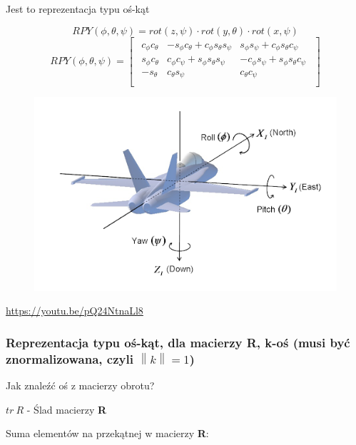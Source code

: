 \documentclass{article}
\newcommand{\norm}[1]{\left\lVert#1\right\rVert}
\begin{document}
Jest to reprezentacja typu oś-kąt

\Large
$$
    RPY\left(\phi, \theta, \psi\right)=rot(z, \psi) \cdot rot(y, \theta) \cdot rot(x, \psi)
$$
$$
    RPY( \phi, \theta, \psi ) = \begin{bmatrix} \begin{array}{rrr}
        c_{\phi} c_{\theta}   & -s_{\phi} c_{\theta} + c_{\phi} s_{\theta} s_{\psi} & s_{\phi} s_{\psi} + c_{\phi} s_{\theta} c_{\psi}  \\
        s_{\phi} c_{\theta}   & c_{\phi} c_{\psi} + s_{\phi} s_{\theta} s_{\psi}    & -c_{\phi} s_{\psi} + s_{\phi} s_{\theta} c_{\psi}  \\
        -s_{\theta}           & c_{\theta} s_{\psi}                                 & c_{\theta} c_{\psi}  \\
    \end{array} \end{bmatrix}
$$
\normalsize


\begin{figure}[h!]
    \centering
    \includegraphics[scale=0.5]{./img/rpy.png}
\end{figure}
\url{https://youtu.be/pQ24NtnaLl8}

\subsubsection{Reprezentacja typu oś-kąt, dla macierzy {\bf R}, k-oś (musi być znormalizowana, czyli $\norm{k}=1$)}

Jak znaleźć oś z macierzy obrotu?

$tr \ R$ - Ślad macierzy {\bf R}

Suma elementów na przekątnej w macierzy {\bf R}:
\end{document}
